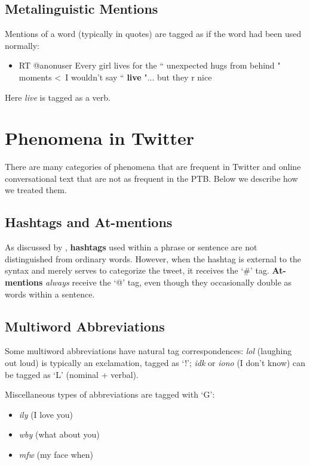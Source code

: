 \documentclass[11pt,letterpaper]{article}
\begin{document}
\subsection{Metalinguistic Mentions}

Mentions of a word (typically in quotes) are tagged as if the word had been used normally:
\begin{itemize}
\item RT @anonuser Every girl lives for the `` unexpected hugs from behind " moments \textless\ I wouldn't say `` \textbf{live} "... but they r nice
\end{itemize}
\noindent Here \emph{live} is tagged as a verb.

\section{Phenomena in Twitter}

There are many categories of phenomena that are frequent in Twitter and online conversational text that are not as frequent in the PTB. Below we describe how we treated them. 

\subsection{Hashtags and At-mentions}

As discussed by , \textbf{hashtags} used within a phrase or sentence are not distinguished from ordinary words. However, when the hashtag is external to the syntax and merely serves to categorize the tweet, it receives the `\#' tag. \textbf{At-mentions} \emph{always} receive the `@' tag, even though they occasionally double as words within a sentence.

\subsection{Multiword Abbreviations}

Some multiword abbreviations have natural tag correspondences: \emph{lol} (laughing out loud) is typically an exclamation, tagged as `!'; \emph{idk} or \emph{iono} (I don't know) can be tagged as `L' (nominal + verbal).

Miscellaneous types of abbreviations are tagged with `G':
\begin{itemize}
\item \emph{ily} (I love you)
\item \emph{wby} (what about you)
\item \emph{mfw} (my face when)
\end{itemize}
\end{document}

